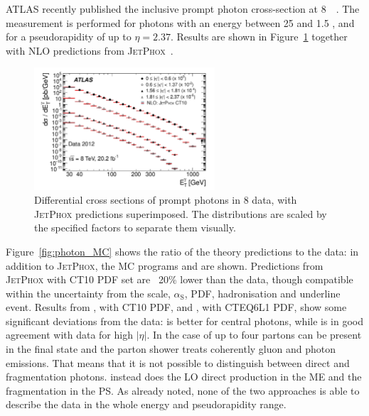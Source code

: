 \documentclass{PoS}
\providecommand{\JETPHOX} {{\textsc{JetPhox}}\xspace}
\def\as{\ensuremath{\alpha_\mathrm{S}}\xspace}
\begin{document}
ATLAS recently published the inclusive prompt photon cross-section at 8~\TeV~\cite{Aad:2016xcr}. The measurement is
performed for photons with an energy between 25 \GeV and 1.5 \TeV, and for a pseudorapidity of up to $\eta = 2.37$. 
Results are shown in Figure~\ref{fig:photon} together with NLO predictions from \JETPHOX~\cite{Catani:2002ny}. 
\begin{figure}
\begin{center}
\includegraphics[width=0.6\textwidth]{Figure11.pdf} 
\caption{Differential cross sections of prompt photons in 8 \TeV data, with \JETPHOX predictions superimposed. The
  distributions are scaled by the specified factors to separate them visually. }  
\label{fig:photon}
\end{center}
\end{figure}
Figure~\ref{fig:photon_MC} shows the ratio of the theory predictions to the data: in addition to \JETPHOX, the MC programs
\PYTHIA and \SHERPA are shown. Predictions from \JETPHOX with CT10 PDF set are ~20\% lower than the data, though compatible within the
uncertainty from the scale, \as, PDF, hadronisation and underline event. Results from \SHERPA, with CT10 PDF, and \PYTHIA, with
CTEQ6L1 PDF, show some significant deviations from the data: \SHERPA is better for central photons, while
\PYTHIA is in good agreement with data for high $|\eta|$. In the case of \SHERPA up to four partons can be present in the
final state and the parton shower treats coherently gluon and photon emissions. That means that it is not possible to
distinguish between direct and fragmentation photons. \PYTHIA instead does the LO direct production in the ME and the
fragmentation in the PS. As already noted, none of the two approaches is able to describe the data in the whole energy
and pseudorapidity range.
\end{document}
